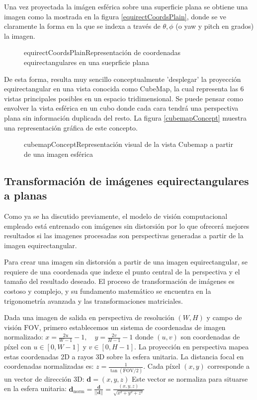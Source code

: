 Una vez proyectada la imágen esférica sobre una superficie plana se obtiene una imagen como la mostrada en la figura \ref{equirectCoordsPlain}, donde se ve claramente la forma en la que se indexa a través de $\theta, \phi$ (o yaw y pitch en grados) la imagen.


\begin{figure}[equirectCoordsPlain]{equirectCoordsPlain}{Representación de coordenadas equirectangulares en una sueprficie plana}
	\begin{center}
	\end{center}
\end{figure}

De esta forma, resulta muy sencillo conceptualmente 'desplegar' la proyección equirectangular en una vista conocida como CubeMap, la cual representa las 6 vistas principales posibles en un espacio tridimensional. Se puede pensar como envolver la vista esférica en un cubo donde cada cara tendrá una perspectiva plana sin información duplicada del resto. La figura \ref{cubemapConcept} muestra una representación gráfica de este concepto.

\begin{figure}[cubemapConcept]{cubemapConcept}{Representación visual de la vista Cubemap a partir de una imagen esférica}
	\begin{center}
	\end{center}
\end{figure}

\subsection{Transformación de imágenes equirectangulares a planas}
Como ya se ha discutido previamente, el modelo de visión computacional empleado está entrenado con imágenes sin distorsión por lo que ofrecerá mejores resultados si las imagenes procesadas son perspectivas generadas a partir de la imagen equirectangular.

Para crear una imagen sin distorsión a partir de una imagen equirectangular, se requiere de una coordenada que indexe el punto central de la perspectiva y el tamaño del resultado deseado. 
El proceso de transformación de imágenes es costoso y complejo, y su fundamento matemático se encuentra en la trigonometría avanzada y las transformaciones matriciales.

Dada una imagen de salida en perspectiva de resolución $(W, H)$ y campo de visión $\text{FOV}$, primero establecemos un sistema de coordenadas de imagen normalizado:
$x = \frac{2u}{W-1} - 1, \quad y = \frac{2v}{H-1} - 1$
donde $(u, v)$ son coordenadas de píxel con $u \in [0, W-1]$ y $v \in [0, H-1]$.
La proyección en perspectiva mapea estas coordenadas 2D a rayos 3D sobre la esfera unitaria. La distancia focal en coordenadas normalizadas es:
$z = \frac{1}{\tan(\text{FOV}/2)}$.
Cada píxel $(x, y)$ corresponde a un vector de dirección 3D:
$\mathbf{d} = (x, y, z)$
Este vector se normaliza para situarse en la esfera unitaria:
$\mathbf{d}_{\text{norm}} = \frac{\mathbf{d}}{||\mathbf{d}||} = \frac{(x, y, z)}{\sqrt{x^2 + y^2 + z^2}}$

